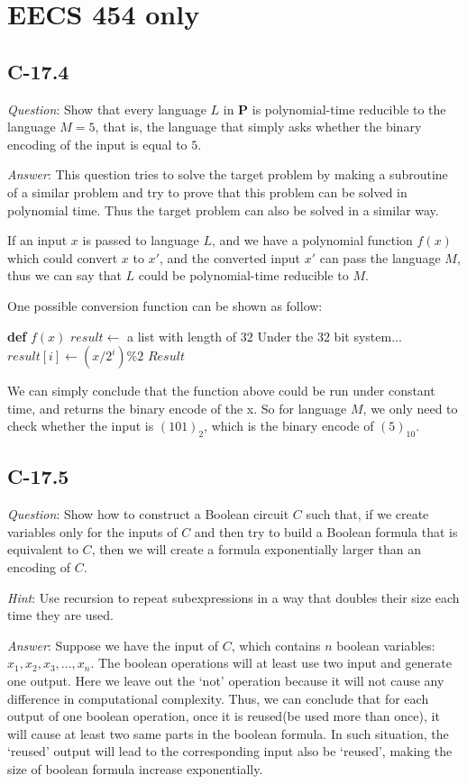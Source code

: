 \documentclass[11pt]{article}
\begin{document}
\section{EECS 454 only}
\subsection{C-17.4}
\noindent \emph{Question}: Show that every language $L$ in \textbf{P} is polynomial-time reducible to the language $M = {5}$, that is, the language that simply asks whether the binary encoding of
the input is equal to $5$.

\noindent \emph{Answer}: This question tries to solve the target problem by making a subroutine of a similar problem and try to prove that this problem can be solved in polynomial time. Thus the target problem can also be solved in a similar way.

If an input $x$ is passed to language $L$, and we have a polynomial function $f(x)$ which could convert $x$ to $x'$, and the converted input $x'$ can pass the language $M$, thus we can say that $L$ could be polynomial-time reducible to $M$.

One possible conversion function can be shown as follow:
\begin{algorithmic}
	\State \textbf{def} $f(x)$
	\State $result \gets$ a list with length of $32$ \Comment Under the 32 bit system...
		\State $result[i] \gets (x/2^i)\%2$
	\EndFor
	\State \Return $Result$
\end{algorithmic}

We can simply conclude that the function above could be run under constant time, and returns the binary encode of the x. So for language $M$, we only need to check whether the input is $(101)_2$, which is the binary encode of $(5)_{10}$.
\subsection{C-17.5}
\noindent \emph{Question}: Show how to construct a Boolean circuit $C$ such that, if we create variables only for the inputs of $C$ and then try to build a Boolean formula that is equivalent to
$C$, then we will create a formula exponentially larger than an encoding of $C$.

\noindent \emph{Hint}: Use recursion to repeat subexpressions in a way that doubles their size each time they are used.

\noindent \emph{Answer}: Suppose we have the input of $C$, which contains $n$ boolean variables: $x_1,x_2,x_3,...,x_n$. The boolean operations will at least use two input and generate one output. Here we leave out the `not' operation because it will not cause any difference in computational complexity. Thus, we can conclude that for each output of one boolean operation, once it is reused(be used more than once), it will cause at least two same parts in the boolean formula. In such situation, the `reused' output will lead to the corresponding input also be `reused', making the size of boolean formula increase exponentially.
\end{document}
